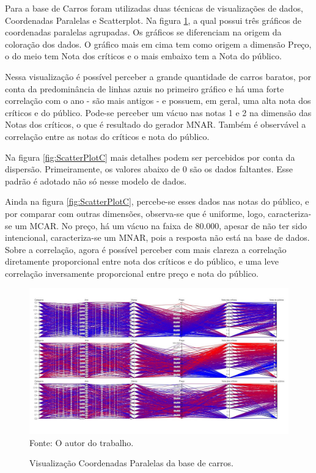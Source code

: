 \documentclass[
	12pt,				%
	openright,			%
	oneside,			%
	a4paper,			%
	english,			%
	brazil				%
	]{abntex2}
\begin{document}
	Para a base de Carros foram utilizadas duas técnicas de visualizações de dados, Coordenadas Paralelas e Scatterplot.
	Na figura \ref{fig:PCCarros}, a qual possui três gráficos de coordenadas paralelas agrupadas.
	Os gráficos se diferenciam na origem da coloração dos dados.
	O gráfico mais em cima tem como origem a dimensão Preço, o do meio tem Nota dos críticos e o mais embaixo tem a Nota do público.
	\par
	Nessa visualização é possível perceber a grande quantidade de carros baratos, por conta da predominância de linhas azuis no primeiro gráfico e há uma forte correlação com o ano - são mais antigos - e possuem, em geral, uma alta nota dos críticos e do público.
	Pode-se perceber um vácuo nas notas 1 e 2 na dimensão das Notas dos críticos, o que é resultado do gerador MNAR.
	Também é observável a correlação entre as notas do críticos e nota do público.
	\par
	Na figura \ref{fig:ScatterPlotC} mais detalhes podem ser percebidos por conta da dispersão.
	Primeiramente, os valores abaixo de 0 são os dados faltantes.
	Esse padrão é adotado não só nesse modelo de dados.
	\par
	Ainda na figura \ref{fig:ScatterPlotC}, percebe-se esses dados nas notas do público, e por comparar com outras dimensões, observa-se que é uniforme, logo, caracteriza-se um MCAR.
	No preço, há um vácuo na faixa de 80.000, apesar de não ter sido intencional, caracteriza-se um MNAR, pois a resposta não está na base de dados.
	Sobre a correlação, agora é possível perceber com mais clareza a correlação diretamente proporcional entre nota dos críticos e do público, e uma leve correlação inversamente proporcional entre preço e nota do público.
	\par

	\begin{figure}[h!]
		\centering
		\caption{Visualização Coordenadas Paralelas da base de carros.}
		\includegraphics[width=\linewidth]{./figures/Resultados/PCCarros.png}
		\label{fig:PCCarros}
		\footnotesize Fonte: O autor do trabalho.
	\end{figure}
\end{document}
